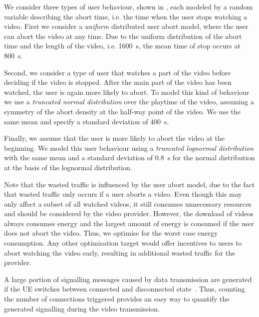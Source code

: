 We consider three types of user behaviour, shown in , each modeled by a random variable describing the abort time, i.e. the time when the user stops watching a video.
First we consider a \emph{uniform} distributed user abort model, where the user can abort the video at any time.
Due to the uniform distribution of the abort time and the length of the video, i.e. \SI{1600}{\second}, the mean time of stop occurs at \SI{800}{\second}.

Second, we consider a type of user that watches a part of the video before deciding if the video is stopped. 
After the main part of the video has been watched, the user is again more likely to abort.
To model this kind of behaviour we use a \emph{truncated normal distribution} over the playtime of the video, assuming a symmetry of the abort density at the half-way point of the video.
We use the same mean and specify a standard deviation of \SI{400}{\second}.

Finally, we assume that the user is more likely to abort the video at the beginning.
We model this user behaviour using a \emph{truncated lognormal distribution} with the same mean and a standard deviation of \SI{0.8}{\second} for the normal distribution at the basis of the lognormal distribution.

Note that the wasted traffic \meanwastedtraffic is influenced by the user abort model, due to the fact that wasted traffic only occurs if a user aborts a video.
Even though this may only affect a subset of all watched videos, it still consumes unnecessary resources and should be considered by the video provider.
However, the download of videos always consumes energy and the largest amount of energy is consumed if the user does not abort the video.
Thus, we optimise for the worst case energy consumption.
Any other optimisation target would offer incentives to users to abort watching the video early, resulting in additional wasted traffic for the provider.


A large portion of signalling messages caused by data transmission are generated if the \gls{UE} switches between connected and disconnected state~\cite{3GPP_RRC_Spec}.
Thus, counting the number of connections \connectioncount triggered provides an easy way to quantify the generated signalling during the video transmission.

